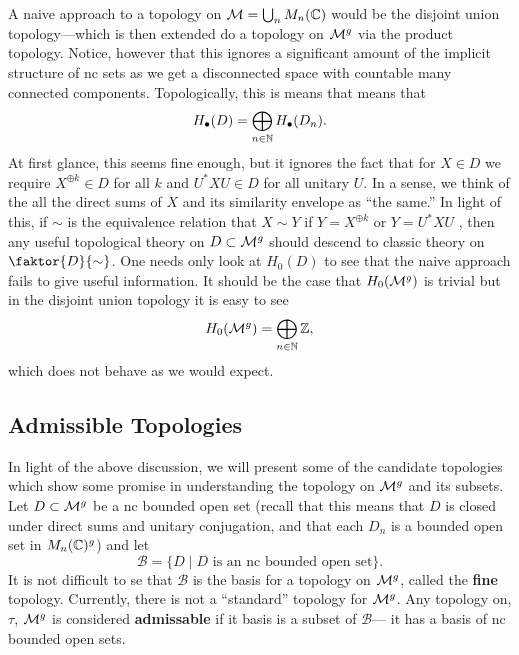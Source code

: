 A naive approach to a topology on \(\mathcal{M} = \bigcup_n M_n(\mathbb{C})\) would be the
disjoint union topology---which is then extended do a topology on \(\mathcal{M}^g\) via
the product topology. Notice, however that this ignores a significant amount of
the implicit structure of nc sets as we get a disconnected space with countable
many connected components. Topologically, this is means that means that
\[
  H_\bullet (D) = \bigoplus_{n \in \mathbb{N} } H_\bullet(D_n).
\]
At first glance, this seems fine enough, but it ignores the fact that for
\(X \in D\) we require \(X^{\oplus k} \in D\) for all \(k\) and \(U^*XU \in D\)
for all unitary \(U\). In a sense, we think of the all the direct sums of \(X\)
and its similarity envelope as ``the same.'' In light of this, if \(\sim\) is
the equivalence relation that \(X\sim Y\) if \(Y = X^{\oplus k}\) or
\(Y = U^*XU\) ,
then any useful topological theory on \(D \subset \mathcal{M}^g\) should descend to
classic theory on \(\faktor{D}{\sim}\). One needs only look at \(H_0(D)\) to see
that the naive approach fails to give useful information. It should be the case
that \(H_0(\mathcal{M}^{g} )\) is trivial but in the disjoint union topology it is easy
to see
\[
  H_0(\mathcal{M}^{g} ) = \bigoplus_{n \in \mathbb{N} } \mathbb{Z} ,
\]
which does not behave as we would expect.


\subsection{Admissible Topologies}%
\label{sec:admtopo}

In light of the above discussion, we will present some of the candidate
topologies which show some promise in understanding the topology on \(\mathcal{M}^g\)
and its subsets.
Let \(D \subset \mathcal{M}^{g} \) be a nc bounded open set (recall that this means that \(D\) is closed under
direct sums and unitary conjugation, and that each \(D_n\) is a bounded open set
in \(M_n(\mathbb{C})^g\)) and let
\[
  \mathcal{B} = \{D \mid  D \textrm{ is an nc bounded open set}\} .
\]
It is not difficult to se that \(\mathcal{B}\) is the basis for a topology on
\(\mathcal{M}^{g}\), called the \textbf{fine} topology. Currently, there is not a
``standard'' topology for \(\mathcal{M}^{g}\). Any topology on, \(\tau\), \(\mathcal{M}^{g}\) is
considered \textbf{admissable} if it basis is a subset of \(\mathcal{B}\)---\ie
it has a basis of nc bounded open sets.


